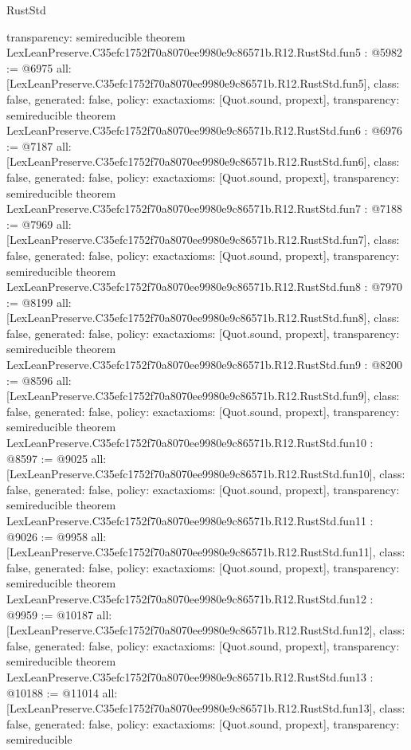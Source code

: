 \begin{lexlean}{RustStd}
\begin{coremodule}
{  transparency: semireducible
}
theorem LexLeanPreserve.C35efc1752f70a8070ee9980e9c86571b.R12.RustStd.fun5 : @5982 := @6975 {
  all: [LexLeanPreserve.C35efc1752f70a8070ee9980e9c86571b.R12.RustStd.fun5],
  class: false,
  generated: false,
  policy: exact{axioms: [Quot.sound, propext]},
  transparency: semireducible
}
theorem LexLeanPreserve.C35efc1752f70a8070ee9980e9c86571b.R12.RustStd.fun6 : @6976 := @7187 {
  all: [LexLeanPreserve.C35efc1752f70a8070ee9980e9c86571b.R12.RustStd.fun6],
  class: false,
  generated: false,
  policy: exact{axioms: [Quot.sound, propext]},
  transparency: semireducible
}
theorem LexLeanPreserve.C35efc1752f70a8070ee9980e9c86571b.R12.RustStd.fun7 : @7188 := @7969 {
  all: [LexLeanPreserve.C35efc1752f70a8070ee9980e9c86571b.R12.RustStd.fun7],
  class: false,
  generated: false,
  policy: exact{axioms: [Quot.sound, propext]},
  transparency: semireducible
}
theorem LexLeanPreserve.C35efc1752f70a8070ee9980e9c86571b.R12.RustStd.fun8 : @7970 := @8199 {
  all: [LexLeanPreserve.C35efc1752f70a8070ee9980e9c86571b.R12.RustStd.fun8],
  class: false,
  generated: false,
  policy: exact{axioms: [Quot.sound, propext]},
  transparency: semireducible
}
theorem LexLeanPreserve.C35efc1752f70a8070ee9980e9c86571b.R12.RustStd.fun9 : @8200 := @8596 {
  all: [LexLeanPreserve.C35efc1752f70a8070ee9980e9c86571b.R12.RustStd.fun9],
  class: false,
  generated: false,
  policy: exact{axioms: [Quot.sound, propext]},
  transparency: semireducible
}
theorem LexLeanPreserve.C35efc1752f70a8070ee9980e9c86571b.R12.RustStd.fun10 : @8597 := @9025 {
  all: [LexLeanPreserve.C35efc1752f70a8070ee9980e9c86571b.R12.RustStd.fun10],
  class: false,
  generated: false,
  policy: exact{axioms: [Quot.sound, propext]},
  transparency: semireducible
}
theorem LexLeanPreserve.C35efc1752f70a8070ee9980e9c86571b.R12.RustStd.fun11 : @9026 := @9958 {
  all: [LexLeanPreserve.C35efc1752f70a8070ee9980e9c86571b.R12.RustStd.fun11],
  class: false,
  generated: false,
  policy: exact{axioms: [Quot.sound, propext]},
  transparency: semireducible
}
theorem LexLeanPreserve.C35efc1752f70a8070ee9980e9c86571b.R12.RustStd.fun12 : @9959 := @10187 {
  all: [LexLeanPreserve.C35efc1752f70a8070ee9980e9c86571b.R12.RustStd.fun12],
  class: false,
  generated: false,
  policy: exact{axioms: [Quot.sound, propext]},
  transparency: semireducible
}
theorem LexLeanPreserve.C35efc1752f70a8070ee9980e9c86571b.R12.RustStd.fun13 : @10188 := @11014 {
  all: [LexLeanPreserve.C35efc1752f70a8070ee9980e9c86571b.R12.RustStd.fun13],
  class: false,
  generated: false,
  policy: exact{axioms: [Quot.sound, propext]},
  transparency: semireducible
}
\end{coremodule}
\end{lexlean}
